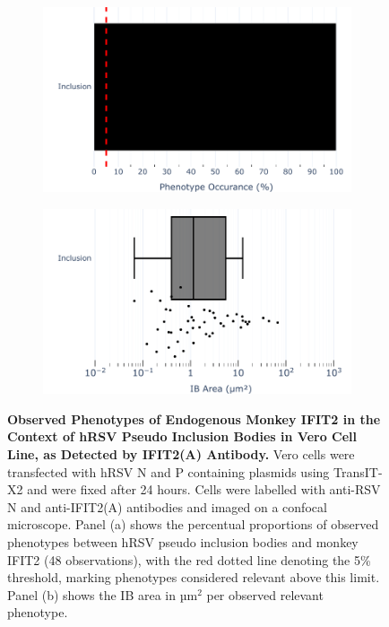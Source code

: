 \begin{figure}
    \begin{subfigure}{0.495\textwidth}
        \caption{}
        \includegraphics[width=1\linewidth]{09. Chapter 4/Figs/01. pIB/03. IFIT2/02. IFIT2A/04. bar_i2a_vero_hnhp.pdf} 
    \end{subfigure}
    \begin{subfigure}{0.495\textwidth}
        \caption{}
        \includegraphics[width=1\linewidth]{09. Chapter 4/Figs/01. pIB/03. IFIT2/02. IFIT2A/05. box_i2a_vero_hnhp.pdf}
    \end{subfigure}
    \caption[Observed Phenotypes of Endogenous Monkey IFIT2 in the Context of hRSV Pseudo Inclusion Bodies in Vero Cell Line, as Detected by IFIT2(A) Antibody.]{\textbf{Observed Phenotypes of Endogenous Monkey IFIT2 in the Context of hRSV Pseudo Inclusion Bodies in Vero Cell Line, as Detected by IFIT2(A) Antibody.} Vero cells were transfected with hRSV N and P containing plasmids using TransIT-X2 and were fixed after 24 hours. Cells were labelled with anti-RSV N and anti-IFIT2(A) antibodies and imaged on a confocal microscope. Panel (a) shows the percentual proportions of observed phenotypes between hRSV pseudo inclusion bodies and monkey IFIT2 (48 observations), with the red dotted line denoting the 5\% threshold, marking phenotypes considered relevant above this limit. Panel (b) shows the IB area in \(\mbox{µm}^2\) per observed relevant phenotype.}
    \label{fig:Observed Phenotypes of Endogenous Monkey IFIT2 in the Context of hRSV Pseudo Inclusion Bodies in Vero Cell Line, as Detected by IFIT2(A) Antibody}
\end{figure}

